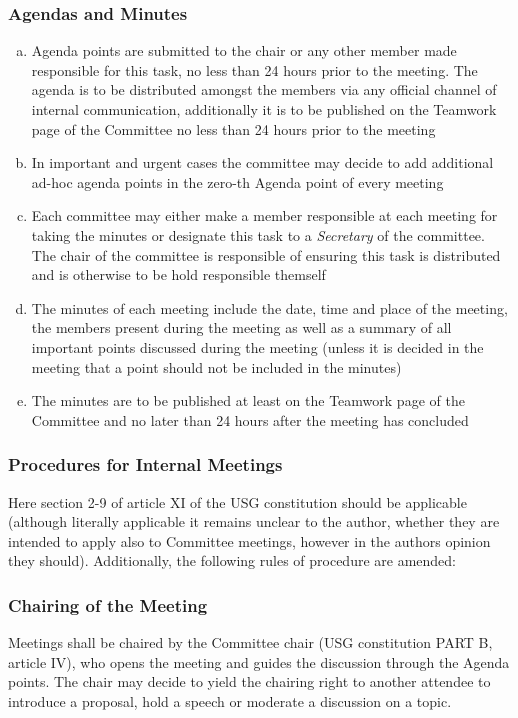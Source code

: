\subsubsection[Agendas and Minutes]{Agendas and Minutes}
\begin{enumerate}[a)]
	\item Agenda points are submitted to the chair or any other member made responsible for this task, no less than 24 hours prior to the meeting. The agenda is to be distributed amongst the members via any official channel of internal communication, additionally it is to be published on the Teamwork page of the Committee no less than 24 hours prior to the meeting 
	\item In important and urgent cases the committee may decide to add additional ad-hoc agenda points in the zero-th Agenda point of every meeting
	\item Each committee may either make a member responsible at each meeting for taking the minutes or designate this task to a \emph{Secretary} of the committee. The chair of the committee is responsible of ensuring this task is distributed and is otherwise to be hold responsible themself
	\item The minutes of each meeting include the date, time and place of the meeting, the members present during the meeting as well as a summary of all important points discussed during the meeting (unless it is decided in the meeting that a point should not be included in the minutes)
	\item The minutes are to be published at least on the Teamwork page of the Committee and no later than 24 hours after the meeting has concluded
\end{enumerate}
\subsubsection[Meeting Procedures]{Procedures for Internal Meetings}
Here section 2-9 of article XI of the USG constitution should be applicable (although literally applicable it remains unclear to the author, whether they are intended to apply also to Committee meetings, however in the authors opinion they should). Additionally, the following rules of procedure are amended:
\subsubsection{Chairing of the Meeting}
Meetings shall be chaired by the Committee chair (USG constitution PART B, article IV), who opens the meeting and guides the discussion through the Agenda points. The chair may decide to yield the chairing right to another attendee to introduce a proposal, hold a speech or moderate a discussion on a topic.
